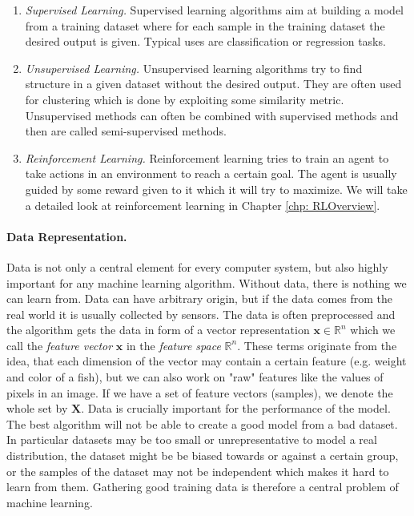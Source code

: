 \begin{enumerate}
  \item \textit{Supervised Learning.} Supervised learning algorithms aim at building a model from a training dataset where for each sample in the training dataset the desired output is given. Typical uses are classification or regression tasks.
  \item \textit{Unsupervised Learning.} Unsupervised learning algorithms try to find structure in a given dataset without the desired output. They are often used for clustering which is done by exploiting some similarity metric. Unsupervised methods can often be combined with supervised methods and then are called semi-supervised methods.
  \item \textit{Reinforcement Learning.} Reinforcement learning tries to train an agent to take actions in an environment to reach a certain goal. The agent is usually guided by some reward given to it which it will try to maximize. We will take a detailed look at reinforcement learning in Chapter \ref{chp: RLOverview}.
\end{enumerate}

\paragraph{Data Representation.} Data is not only a central element for every computer system, but also highly important for any machine learning algorithm. Without data, there is nothing we can learn from. Data can have arbitrary origin, but if the data comes from the real world it is usually collected by sensors. The data is often preprocessed and the algorithm gets the data in form of a vector representation $\mathbf{x} \in \mathbb{R}^n$ which we call the \textit{feature vector} $\mathbf{x}$ in the \textit{feature space} $\mathbb{R}^n$. These terms originate from the idea, that each dimension of the vector may contain a certain feature (e.g. weight and color of a fish), but we can also work on "raw" features like the values of pixels in an image. If we have a set of feature vectors (samples), we denote the whole set by $\mathbf{X}$. Data is crucially important for the performance of the model. The best algorithm will not be able to create a good model from a bad dataset. In particular datasets may be too small or unrepresentative to model a real distribution, the dataset might be be biased towards or against a certain group, or the samples of the dataset may not be independent which makes it hard to learn from them. Gathering good training data is therefore a central problem of machine learning.

